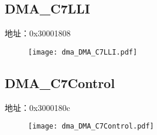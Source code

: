 \subsection{DMA\_C7LLI}
\label{dma-DMA-C7LLI}
地址：0x30001808
 \begin{figure}[H]
\texttt{[image: dma\_DMA\_C7LLI.pdf]}
\end{figure}

\subsection{DMA\_C7Control}
\label{dma-DMA-C7Control}
地址：0x3000180c
 \begin{figure}[H]
\texttt{[image: dma\_DMA\_C7Control.pdf]}
\end{figure}

